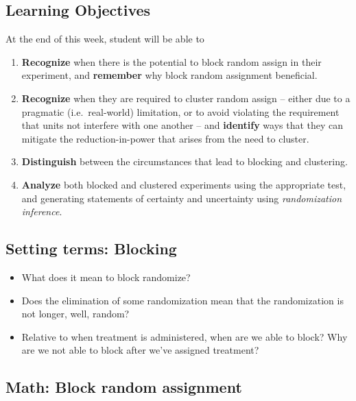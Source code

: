 \documentclass[
]{article}
\providecommand{\tightlist}{%
  \setlength{\itemsep}{0pt}\setlength{\parskip}{0pt}}
\begin{document}
\hypertarget{learning-objectives-3}{%
\subsection{Learning Objectives}\label{learning-objectives-3}}

At the end of this week, student will be able to

\begin{enumerate}
\def\labelenumi{\arabic{enumi}.}
\tightlist
\item
  \textbf{Recognize} when there is the potential to block random assign in their experiment, and \textbf{remember} why block random assignment beneficial.
\item
  \textbf{Recognize} when they are required to cluster random assign -- either due to a pragmatic (i.e.~real-world) limitation, or to avoid violating the requirement that units not interfere with one another -- and \textbf{identify} ways that they can mitigate the reduction-in-power that arises from the need to cluster.
\item
  \textbf{Distinguish} between the circumstances that lead to blocking and clustering.
\item
  \textbf{Analyze} both blocked and clustered experiments using the appropriate test, and generating statements of certainty and uncertainty using \emph{randomization inference}.
\end{enumerate}

\hypertarget{setting-terms-blocking}{%
\subsection{Setting terms: Blocking}\label{setting-terms-blocking}}

\begin{itemize}
\tightlist
\item
  What does it mean to block randomize?
\item
  Does the elimination of some randomization mean that the randomization is not longer, well, random?
\item
  Relative to when treatment is administered, when are we able to block? Why are we not able to block after we've assigned treatment?
\end{itemize}

\hypertarget{math-block-random-assignment}{%
\subsection{Math: Block random assignment}\label{math-block-random-assignment}}
\end{document}
